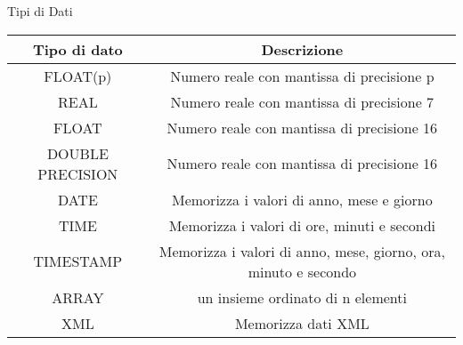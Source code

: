 \begin{frame}[allowframebreaks]{Tipi di Dati}
        \centering
    \begin{tabular}{|c|c|}
        \hline
        \rowcolor{cyan!30}Tipo di dato & Descrizione \\
        \hline
        FLOAT(p) & Numero reale con mantissa di precisione p \\ \hline
        REAL & Numero reale con mantissa di precisione 7 \\ \hline
        FLOAT & Numero reale con mantissa di precisione 16 \\ \hline
        DOUBLE PRECISION & Numero reale con mantissa di precisione 16 \\ \hline
        DATE & Memorizza i valori di anno, mese e giorno \\ \hline
        TIME & Memorizza i valori di ore, minuti e secondi \\ \hline
        TIMESTAMP & Memorizza i valori di anno, mese, giorno, ora, minuto e secondo \\ \hline
        ARRAY & un insieme ordinato di n elementi \\ \hline
        XML & Memorizza dati XML \\ \hline
        \end{tabular}
\end{frame}